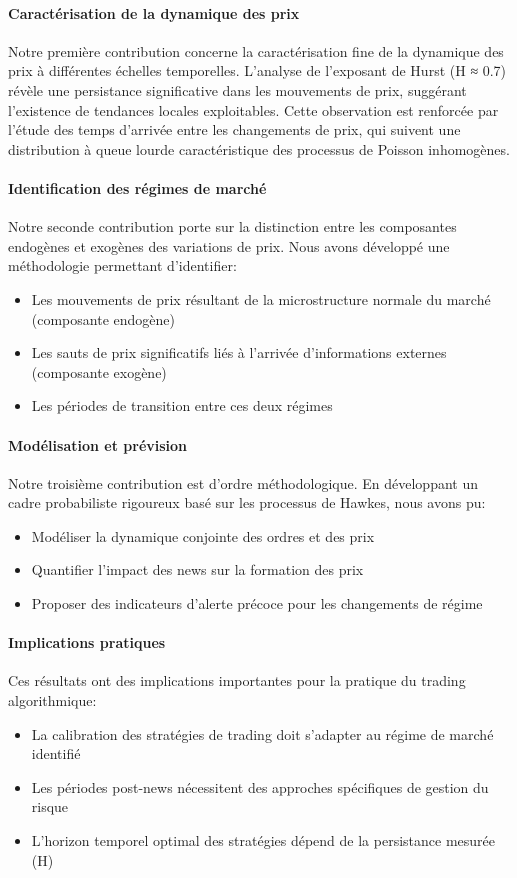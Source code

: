 \documentclass[12pt,a4paper]{article}
\theoremstyle{definition}
\theoremstyle{remark}
\begin{document}
\paragraph{\textbf{Caractérisation de la dynamique des prix}} Notre première contribution concerne la caractérisation fine de la dynamique des prix à différentes échelles temporelles. L'analyse de l'exposant de Hurst (H ≈ 0.7) révèle une persistance significative dans les mouvements de prix, suggérant l'existence de tendances locales exploitables. Cette observation est renforcée par l'étude des temps d'arrivée entre les changements de prix, qui suivent une distribution à queue lourde caractéristique des processus de Poisson inhomogènes.

\paragraph{\textbf{Identification des régimes de marché}} Notre seconde contribution porte sur la distinction entre les composantes endogènes et exogènes des variations de prix. Nous avons développé une méthodologie permettant d'identifier:
\begin{itemize}
    \item Les mouvements de prix résultant de la microstructure normale du marché (composante endogène)
    \item Les sauts de prix significatifs liés à l'arrivée d'informations externes (composante exogène)
    \item Les périodes de transition entre ces deux régimes
\end{itemize}

\paragraph{\textbf{Modélisation et prévision}} Notre troisième contribution est d'ordre méthodologique. En développant un cadre probabiliste rigoureux basé sur les processus de Hawkes, nous avons pu:
\begin{itemize}
    \item Modéliser la dynamique conjointe des ordres et des prix
    \item Quantifier l'impact des news sur la formation des prix
    \item Proposer des indicateurs d'alerte précoce pour les changements de régime
\end{itemize}

\paragraph{\textbf{Implications pratiques}} Ces résultats ont des implications importantes pour la pratique du trading algorithmique:
\begin{itemize}
    \item La calibration des stratégies de trading doit s'adapter au régime de marché identifié
    \item Les périodes post-news nécessitent des approches spécifiques de gestion du risque
    \item L'horizon temporel optimal des stratégies dépend de la persistance mesurée (H)
\end{itemize}
\end{document}
